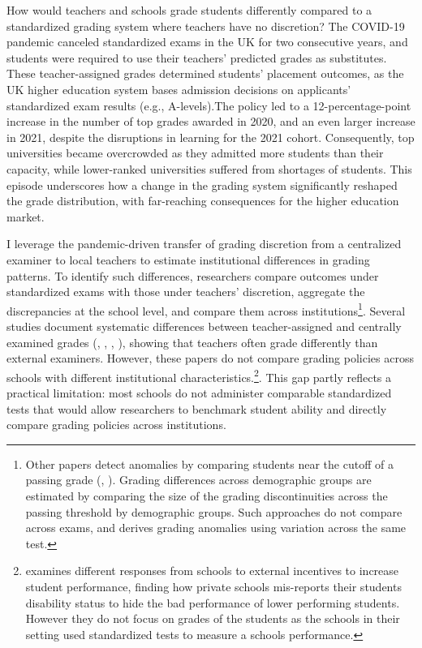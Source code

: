 
How would teachers and schools grade students differently compared to a standardized grading system where teachers have no discretion? The COVID-19 pandemic canceled standardized exams in the UK for two consecutive years, and students were required to use their teachers’ predicted grades as substitutes. These teacher-assigned grades determined students’ placement outcomes, as the UK higher education system bases admission decisions on applicants’ standardized exam results (e.g., A-levels).The policy led to a 12-percentage-point increase in the number of top grades awarded in 2020, and an even larger increase in 2021, despite the disruptions in learning for the 2021 cohort. Consequently, top universities became overcrowded as they admitted more students than their capacity, while lower-ranked universities suffered from shortages of students. This episode underscores how a change in the grading system significantly reshaped the grade distribution, with far-reaching consequences for the higher education market.

I leverage the pandemic-driven transfer of grading discretion from a centralized examiner to local teachers to estimate institutional differences in grading patterns. To identify such differences, researchers compare outcomes under standardized exams with those under teachers’ discretion, aggregate the discrepancies at the school level, and compare them across institutions\footnote{Other papers detect anomalies by comparing students near the cutoff of a passing grade (\cite{neal2008}, \cite{diamond}). Grading differences across demographic groups are estimated by comparing the size of the grading discontinuities across the passing threshold by demographic groups. Such approaches do not compare across exams, and derives grading anomalies using variation across the same test.}. Several studies document systematic differences between teacher-assigned and centrally examined grades (\cite{10.1162/00335530360698441}, \cite{lavy2009}, \cite{hanna2012}, \cite{dee2019}), showing that teachers often grade differently than external examiners. However, these papers do not compare grading policies across schools with different institutional characteristics.\footnote{\cite{figlio2006} examines different responses from schools to external incentives to increase student performance, finding how private schools mis-reports their students disability status to hide the bad performance of lower performing students. However they do not focus on grades of the students as the schools in their setting used standardized tests to measure a schools performance.}. This gap partly reflects a practical limitation: most schools do not administer comparable standardized tests that would allow researchers to benchmark student ability and directly compare grading policies across institutions.

